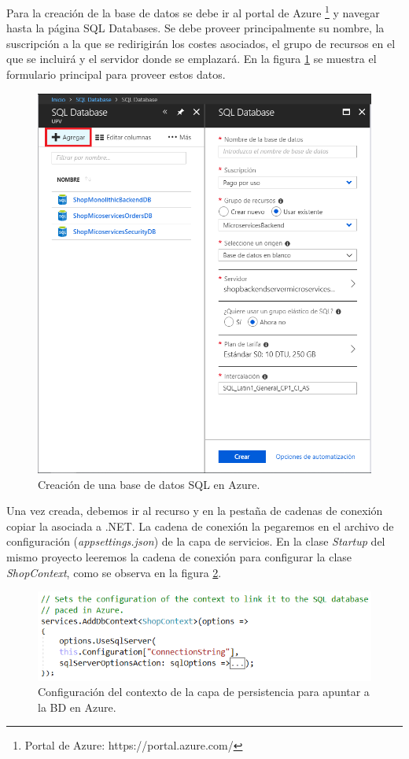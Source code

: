 \documentclass[11pt,spanish,listoffigures]{tfgetsinf}
\begin{document}
Para la creación de la base de datos se debe ir al portal de Azure \footnote{ Portal de Azure: https://portal.azure.com/} y navegar hasta la página SQL Databases. Se debe proveer principalmente su nombre, la suscripción a la que se redirigirán los costes asociados, el grupo de recursos en el que se incluirá y el servidor donde se emplazará. En la figura \ref{fig:CreateDB} se muestra el formulario principal para proveer estos datos.

\begin{figure}[h]
\centering
\includegraphics[scale=0.4]{CreateDB}
\caption{Creación de una base de datos SQL en Azure.}
\label{fig:CreateDB}
\end{figure}

Una vez creada, debemos ir al recurso y en la pestaña de cadenas de conexión copiar la asociada a .NET. La cadena de conexión la pegaremos en el archivo de configuración (\textit{appsettings.json}) de la capa de servicios. En la clase \textit{Startup} del mismo proyecto leeremos la cadena de conexión para configurar la clase \textit{ShopContext}, como se observa en la figura \ref{fig:AddDbContext}.

\begin{figure}[h]
\centering
\includegraphics[scale=0.7]{AddDbContext}
\caption{Configuración del contexto de la capa de persistencia para apuntar a la BD en Azure.}
\label{fig:AddDbContext}
\end{figure}
\end{document}

